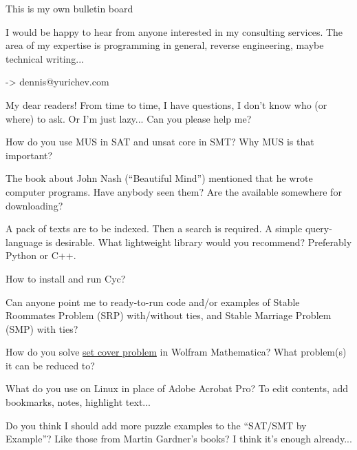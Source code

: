 
\begin{center}
\LARGE{} This is my own bulletin board \normalsize{}
\end{center}

I would be happy to hear from anyone interested in my consulting services.
The area of my expertise is programming in general, reverse engineering, maybe technical writing...

-> dennis@yurichev.com

\myhrule{}

My dear readers! From time to time, I have questions, I don't know who (or where) to ask.
Or I'm just lazy...
Can you please help me?

\myhrule{}

How do you use MUS in SAT and unsat core in SMT?
Why MUS is that important?

\myhrule{}

The book about John Nash (``Beautiful Mind'') mentioned that he wrote computer programs.
Have anybody seen them? Are the available somewhere for downloading?

\myhrule{}

A pack of texts are to be indexed. Then a search is required. A simple query-language is desirable.
What lightweight library would you recommend?
Preferably Python or C++.

\myhrule{}

How to install and run Cyc?

\myhrule{}

Can anyone point me to ready-to-run code and/or examples of
Stable Roommates Problem (SRP) with/without ties,
and Stable Marriage Problem (SMP) with ties?

\myhrule{}

How do you solve \href{https://en.wikipedia.org/wiki/Set_cover_problem}{set cover problem} in Wolfram Mathematica?
What problem(s) it can be reduced to?

\myhrule{}

What do you use on Linux in place of Adobe Acrobat Pro?
To edit contents, add bookmarks, notes, highlight text...

\myhrule{}

Do you think I should add more puzzle examples to the ``SAT/SMT by Example''?
Like those from Martin Gardner's books?
I think it's enough already...

\myhrule{}

